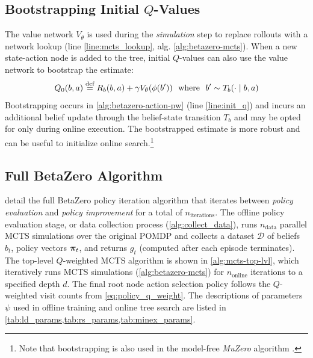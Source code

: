 \subsection{Bootstrapping Initial \texorpdfstring{$Q$}{Q}-Values}
The value network $V_\theta$ is used during the \textit{simulation} step to replace rollouts with a network lookup (line \ref*{line:mcts_lookup}, alg. \ref{alg:betazero-mcts}).
When a new state-action node is added to the tree, initial $Q$-values can also use the value network to bootstrap the estimate:
\begin{equation}
    Q_0(b, a) \stackrel{\text{def}}{=} R_b(b, a) + \gamma V_\theta(\phi(b')) \ \  \text{where} \ \  b' \sim T_b(\cdot \mid b, a)
\end{equation}
Bootstrapping occurs in \cref{alg:betazero-action-pw} (line \ref*{line:init_q}) and incurs an additional belief update through the belief-state transition $T_b$ and may be opted for only during online execution.
The bootstrapped estimate is more robust \cite{kumar2019stabilizing} and can be useful to initialize online search.\footnote{Note that bootstrapping is also used in the model-free \textit{MuZero} algorithm \cite{schrittwieser2020mastering}.}


\subsection{Full BetaZero Algorithm}

 detail the full BetaZero policy iteration algorithm that iterates between \textit{policy evaluation} and \textit{policy improvement} for a total of $n_\text{iterations}$.
The offline policy evaluation stage, or data collection process (\cref{alg:collect_data}), runs $n_\text{data}$ parallel MCTS simulations over the original POMDP and collects a dataset $\mathcal{D}$ of beliefs $b_t$, policy vectors $\boldsymbol\pi_t$, and returns $g_t$ (computed after each episode terminates).
The top-level $Q$-weighted MCTS algorithm is shown in \cref{alg:mcts-top-lvl}, which iteratively runs MCTS simulations (\cref{alg:betazero-mcts}) for $n_\text{online}$ iterations to a specified depth $d$.
The final root node action selection policy follows the $Q$-weighted visit counts from \cref{eq:policy_q_weight}.
The descriptions of parameters $\psi$ used in offline training and online tree search are listed in \cref{tab:ld_params,tab:rs_params,tab:minex_params}.

\begin{figure}[!p]
    \centering
    \begin{minipage}{\textwidth}
        
    \end{minipage}
\end{figure}

